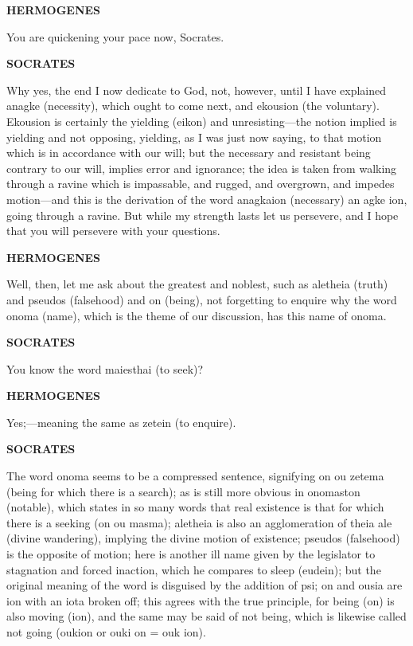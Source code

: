 \documentclass[11pt,letter]{article}
\begin{document}
\par \textbf{HERMOGENES}
\par   You are quickening your pace now, Socrates.

\par \textbf{SOCRATES}
\par   Why yes, the end I now dedicate to God, not, however, until I have explained anagke (necessity), which ought to come next, and ekousion (the voluntary). Ekousion is certainly the yielding (eikon) and unresisting—the notion implied is yielding and not opposing, yielding, as I was just now saying, to that motion which is in accordance with our will; but the necessary and resistant being contrary to our will, implies error and ignorance; the idea is taken from walking through a ravine which is impassable, and rugged, and overgrown, and impedes motion—and this is the derivation of the word anagkaion (necessary) an agke ion, going through a ravine. But while my strength lasts let us persevere, and I hope that you will persevere with your questions.

\par \textbf{HERMOGENES}
\par   Well, then, let me ask about the greatest and noblest, such as aletheia (truth) and pseudos (falsehood) and on (being), not forgetting to enquire why the word onoma (name), which is the theme of our discussion, has this name of onoma.

\par \textbf{SOCRATES}
\par   You know the word maiesthai (to seek)?

\par \textbf{HERMOGENES}
\par   Yes;—meaning the same as zetein (to enquire).

\par \textbf{SOCRATES}
\par   The word onoma seems to be a compressed sentence, signifying on ou zetema (being for which there is a search); as is still more obvious in onomaston (notable), which states in so many words that real existence is that for which there is a seeking (on ou masma); aletheia is also an agglomeration of theia ale (divine wandering), implying the divine motion of existence; pseudos (falsehood) is the opposite of motion; here is another ill name given by the legislator to stagnation and forced inaction, which he compares to sleep (eudein); but the original meaning of the word is disguised by the addition of psi; on and ousia are ion with an iota broken off; this agrees with the true principle, for being (on) is also moving (ion), and the same may be said of not being, which is likewise called not going (oukion or ouki on = ouk ion).
\end{document}
